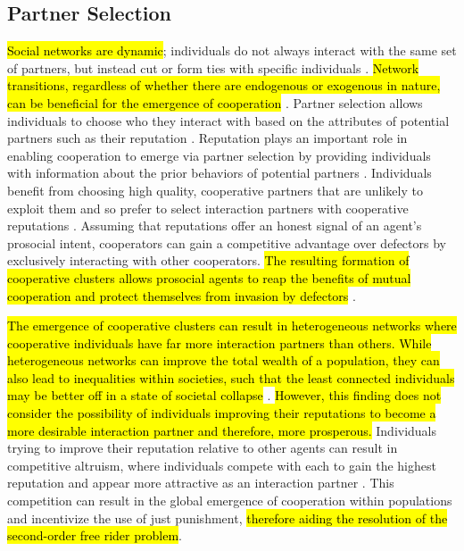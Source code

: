 \documentclass[sn-aps,numbered]{sn-jnl}%
\theoremstyle{thmstyleone}%
\theoremstyle{thmstyletwo}%
\theoremstyle{thmstylethree}%
\begin{document}
\subsection{Partner Selection}

\hl{Social networks are dynamic}; individuals do not always interact with the same set of partners, but instead cut or form ties with specific individuals \citep{Rand2011, networks_reliable_rep_coop_review, su2023strategy}. \hl{Network transitions, regardless of whether there are endogenous or exogenous in nature, can be beneficial for the emergence of cooperation} \citep{allen2017evolutionary}. Partner selection allows individuals to choose who they interact with based on the attributes of potential partners such as their reputation \citep{mirco_partner_selection}. Reputation plays an important role in enabling cooperation to emerge via partner selection by providing individuals with information about the prior behaviors of potential partners \citep{Feng_partnerchoice, networks_reliable_rep_coop_review, Rand2011, Milinski2002, Albert2007_nicer, Barclay2007, Sylwester2010}. Individuals benefit from choosing high quality, cooperative partners that are unlikely to exploit them and so prefer to select interaction partners with cooperative reputations \citep{Roberts2021, Albert2007_nicer, coop_sizes_punish_partner_choice_rep}. Assuming that reputations offer an honest signal of an agent’s prosocial intent, cooperators can gain a competitive advantage over defectors by exclusively interacting with other cooperators. \hl{The resulting formation of cooperative clusters allows prosocial agents to reap the benefits of mutual cooperation and protect themselves from invasion by defectors} \citep{networks_reliable_rep_coop_review, parity_sympathy_reciprocity, incentive_robustness}. 

\hl{The emergence of cooperative clusters can result in heterogeneous networks where cooperative individuals have far more interaction partners than others. While heterogeneous networks can improve the total wealth of a population, they can also lead to inequalities within societies, such that the least connected individuals may be better off in a state of societal collapse} \citep{mcavoy2020social}. \hl{However, this finding does not consider the possibility of individuals improving their reputations to become a more desirable interaction partner and therefore, more prosperous.} Individuals trying to improve their reputation relative to other agents can result in competitive altruism, where individuals compete with each to gain the highest reputation and appear more attractive as an interaction partner \citep{Milinski2002, Roberts2021, Barclay2007}. This competition can result in the global emergence of cooperation within populations \citep{coop_sizes_punish_partner_choice_rep} and incentivize the use of just punishment, \hl{therefore aiding the resolution of the second-order free rider problem}. 
\end{document}

